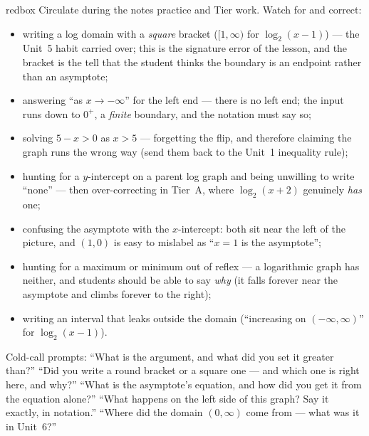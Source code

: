 \documentclass[10pt]{article}
\begin{document}
\begin{skillbox}{redbox}
Circulate during the notes practice and Tier work. Watch for and correct:
\begin{itemize}[leftmargin=1.2em, nosep]
  \item writing a log domain with a \emph{square} bracket ($[1,\infty)$ for $\log_2(x-1)$) --- the Unit~5 habit carried over; this is the signature error of the lesson, and the bracket is the tell that the student thinks the boundary is an endpoint rather than an asymptote;
  \item answering ``as $x\to-\infty$'' for the left end --- there is no left end; the input runs down to $0^{+}$, a \emph{finite} boundary, and the notation must say so;
  \item solving $5-x>0$ as $x>5$ --- forgetting the flip, and therefore claiming the graph runs the wrong way (send them back to the Unit~1 inequality rule);
  \item hunting for a $y$-intercept on a parent log graph and being unwilling to write ``none'' --- then over-correcting in Tier~A, where $\log_2(x+2)$ genuinely \emph{has} one;
  \item confusing the asymptote with the $x$-intercept: both sit near the left of the picture, and $(1,0)$ is easy to mislabel as ``$x=1$ is the asymptote'';
  \item hunting for a maximum or minimum out of reflex --- a logarithmic graph has neither, and students should be able to say \emph{why} (it falls forever near the asymptote and climbs forever to the right);
  \item writing an interval that leaks outside the domain (``increasing on $(-\infty,\infty)$'' for $\log_2(x-1)$).
\end{itemize}
Cold-call prompts: ``What is the argument, and what did you set it greater than?'' ``Did you write a
round bracket or a square one --- and which one is right here, and why?'' ``What is the asymptote's
equation, and how did you get it from the equation alone?'' ``What happens on the left side of this
graph? Say it exactly, in notation.'' ``Where did the domain $(0,\infty)$ come from --- what was it in
Unit~6?''
\end{skillbox}
\end{document}
